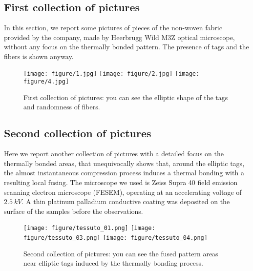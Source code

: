 \subsection{First collection of pictures}
In this section, we report some pictures of pieces of the non-woven fabric provided by the company, made by Heerbrugg Wild M3Z optical microscope, without any focus on the thermally bonded pattern. The presence of tags and the fibers is shown anyway. 

\begin{figure}[H]
  \begin{center}
    \texttt{[image: figure/1.jpg]}
    \texttt{[image: figure/2.jpg]}
    \texttt{[image: figure/4.jpg]}
  \end{center}
  \caption{First collection of pictures: you can see the elliptic shape of the tags and randomness of fibers.}
  \label{fig:microscopio1}
\end{figure}
\subsection{Second collection of pictures}
Here we report another collection of pictures with a detailed focus on the thermally bonded areas, that unequivocally shows that, around the elliptic tags, the almost instantaneous compression process induces a thermal bonding with a resulting local fusing. The microscope we used is Zeiss Supra 40 field emission scanning electron microscope (FESEM), operating at an accelerating voltage of $2.5\ \unit{kV}$. A thin platinum palladium conductive coating was deposited on the surface of the samples before the observations.
\begin{figure}[H]
  \begin{center}
    \texttt{[image: figure/tessuto\_01.png]}
    \texttt{[image: figure/tessuto\_03.png]}
    \texttt{[image: figure/tessuto\_04.png]}
  \end{center}
  \caption{Second collection of pictures: you can see the fused pattern areas near elliptic tags induced by the thermally bonding process.}
  \label{fig:microscopio3}
\end{figure}
